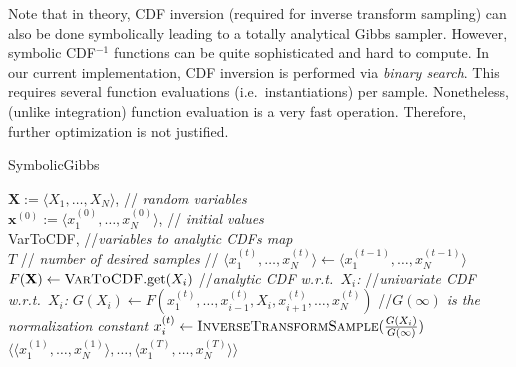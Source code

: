 \documentclass{article}
\newcommand{\tuple}[1] {\langle #1 \rangle}
\newcommand{\bvec}[1]{\textbf{#1}}
\begin{document}
{Note that in theory, CDF inversion (required for inverse transform sampling)
can also be done symbolically leading to a totally analytical Gibbs sampler.
However, symbolic CDF$^{-1}$ functions can be quite sophisticated and hard to compute. 
In our current implementation, CDF inversion is performed via \emph{binary search}. This requires several function evaluations (i.e.\ instantiations) per sample. Nonetheless, (unlike integration) function evaluation is a very fast operation. Therefore, further optimization is not justified.    




\begin{algorithm}[hb!]%
\caption{{\sc SymbolicGibbs}  
\label{alg:symbolic-gibbs}}
\begin{algorithmic}
{$\bvec{X} := \tuple{X_1, \ldots, X_N}$, 				\hspace*{\fill}// \emph{\small random variables} \\
 $\bvec{x}^{(0)} := \tuple{x_1^{(0)}, \ldots, x_N^{(0)}}$, 	\hspace*{\fill}// \emph{\small initial values} \\
{\sc VarToCDF}, 								\hspace*{\fill}//\emph{\small variables to analytic CDFs map} \\
 $T$ 										\hspace*{\fill}// \emph{\small number of desired samples } }
//%
{\small
	 \STATE $\tuple{x_1^{(t)}, \ldots, x_N^{(t)}} \leftarrow \tuple{x_1^{(t-1)}, \ldots, x_N^{(t-1)}}$    
	\FOR{ {\bf each} $X_i \in \bvec{X}$}
		\STATE $F(\bvec{X}) \leftarrow \textsc{VarToCDF}.\text{get}(X_i)$ //\emph{analytic CDF w.r.t.\ $X_i$:}
		\STATE //\emph{univariate CDF w.r.t.\ $X_i$:}
		\STATE 	$G(X_i) \leftarrow F(x_1^{(t)}, \ldots, x_{i-1}^{(t)}, X_i, x_{i+1}^{(t)}, \ldots, x_N^{(t)})$ 
		\STATE //\emph{$G(\infty)$ is the normalization constant}
		\STATE $x_i^{(t)} \leftarrow \textsc{InverseTransformSample}(\frac{G(X_i)}{G(\infty)})$
	\ENDFOR %
\ENDFOR %
 {$\big\langle
			\tuple{x_1^{(1)}, \ldots, x_N^{(1)}}, \ldots, 
			\tuple{x_1^{(T)}, \ldots, x_N^{(T)}}
		\big\rangle$}\;
%	
} %
\end{algorithmic}
\end{algorithm}


}
\end{document}
